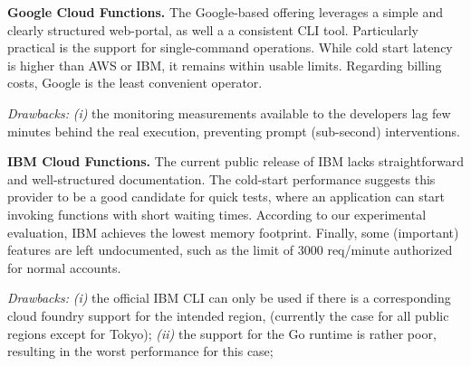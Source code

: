 \textbf{Google Cloud Functions.} The Google-based offering leverages a simple and clearly structured web-portal, as well a a consistent \gls{CLI} tool. 
Particularly practical is the support for single-command operations. 
While cold start latency is higher than AWS or IBM, it remains within usable limits. 
Regarding billing costs, Google is the least convenient operator.

\emph{Drawbacks:}
\emph{(i)} the monitoring measurements available to the developers lag few minutes behind the real execution, preventing prompt (\eg sub-second) interventions.

\textbf{IBM Cloud Functions.}
The current public release of IBM lacks straightforward and well-structured documentation.
The cold-start performance suggests this provider to be a good candidate for quick tests, where an application can start invoking functions with short waiting times.
According to our experimental evaluation, IBM achieves the lowest memory footprint.
Finally, some (important) features are left undocumented, such as the limit of 3000 req/minute authorized for normal accounts.

\emph{Drawbacks:}
\emph{(i)} the official IBM \gls{CLI} can only be used if there is a corresponding cloud foundry support for the intended region, (currently the case for all public regions except for Tokyo);
\emph{(ii)} the support for the Go runtime is rather poor, resulting in the worst performance for this case;
 

